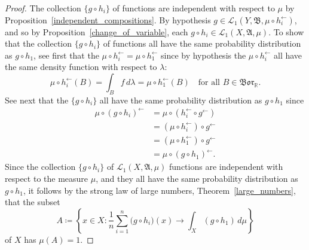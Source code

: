 \documentclass[
twoside=true,
paper=letter,
fontsize=11pt,
pagesize=auto,
leqno,
openany,
headsepline,
overfullrule,
]{scrbook}
\theoremstyle{plain}
\theoremstyle{plain}
\theoremstyle{definition}
\theoremstyle{bfnoteitalic}
\theoremstyle{bfnoteroman}
\newcommand{\sigalg}[1]{\mathfrak{#1}}
\newcommand{\cali}[1]{\mathscr{#1}}
\newcommand{\definedby}{\coloneqq}
\newcommand{\borel}{\mathfrak{Bor}}
\newcommand{\preimage}[1]{#1^{\leftarrow}}
\newcommand{\R}{\mathbb{R}}
\newcommand{\sigmaalgebra}{\sigalg{A}}
\newcommand{\sigmaalgebraii}{\sigalg{B}}
\newcommand{\funcg}{g}
\newcommand{\funch}{h}
\newcommand{\function}{f}
\newcommand{\functionii}{g}
\newcommand{\functioniii}{h}
\newcommand{\measurespace}{X}
\newcommand{\measurespaceii}{Y}
\newcommand{\mspaceelt}{x}
\newcommand{\measure}{\mu}
\newcommand{\measmu}{\mu}
\newcommand{\measureiii}{\lambda}
\newcommand{\seti}{A}
\newcommand{\setii}{B}
\begin{document}
\begin{proof}
The collection 
$\{
\funcg\circ\funch_i
\}$
of functions are independent with respect to $\measmu$
by Proposition~\ref{independent_compositions}.
By hypothesis
$\funcg\in
\cali{L}_1(\measurespaceii,\sigmaalgebraii,\measmu\circ\preimage{\funch_i})$,
and so by Proposition~\ref{change_of_variable}, each
$\funcg\circ\funch_i
\in
\cali{L}_1(\measurespace, \sigmaalgebra, \measmu)$.
To show that the collection 
$\{
\functionii\circ\functioniii_i
\}$
of functions all have the same probability distribution as $\functionii\circ\functioniii_1$, 
see first that the 
$\measure\circ \preimage{\functioniii_i} = \measure\circ\preimage{\functioniii_1}$ since by hypothesis the 
$\measure\circ \preimage{\functioniii_i}$ all have the same density function with respect to 
$\measureiii$:
\[
\measure\circ \preimage{\functioniii_i} (\setii) 
=
\int_\setii \function\, d\measureiii
=
\measure\circ \preimage{\functioniii_1} (\setii) 
\quad\text{for all $\setii\in\borel_\R$.}
\]
See next that the $\{
\functionii\circ\functioniii_i
\}$
all have the same probability distribution as $\funcg\circ\funch_1$ since
\begin{align*}
\measure\circ \preimage{(\functionii \circ\functioniii_i)}
& = \measure\circ(\preimage{\functioniii_i}\circ\preimage{\functionii}) \\
& = (\measure\circ\preimage{\functioniii_i})\circ\preimage{\functionii} \\
& = (\measure\circ\preimage{\functioniii_1})\circ\preimage{\functionii} \\
& = \measure\circ \preimage{(\functionii \circ\functioniii_1)}.
\end{align*}
Since the collection 
$\{
\functionii\circ\functioniii_i
\}$
of
$\cali{L}_1(\measurespace, \sigmaalgebra, \measure)$
functions are independent with respect to the measure $\measure$, and they all have the same probability distribution as
$\functionii\circ\functioniii_1$, it follows by the strong law of large numbers, Theorem~\ref{large_numbers}, that the subset 
\[
\seti\definedby
\left\{ 
\mspaceelt\in\measurespace : 
\frac{1}{n} \sum_{i=1}^n \bigl( \functionii\circ \functioniii_i \bigr) (x) \to
\int_\measurespace (\functionii \circ \functioniii_1) \,d\measure 
\right\}
\]
of $\measurespace$ has $\measure(\seti)=1$. 


\end{proof}
\end{document}
